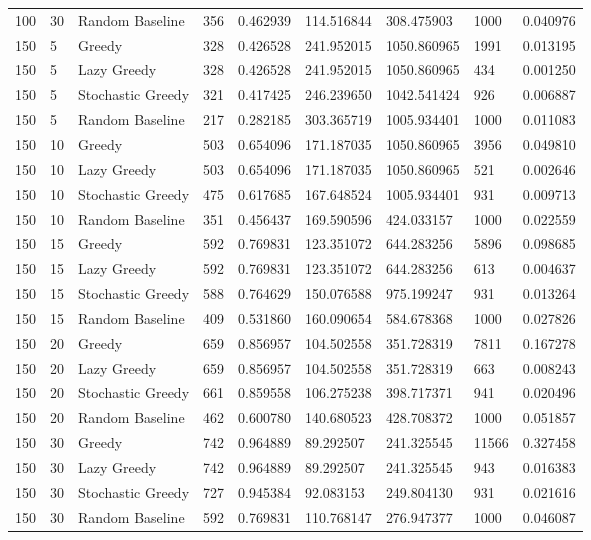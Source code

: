 \begin{tabular}{lllllllll}
100 & 30 & Random Baseline & 356 & 0.462939 & 114.516844 & 308.475903 & 1000 & 0.040976 \\
150 & 5 & Greedy & 328 & 0.426528 & 241.952015 & 1050.860965 & 1991 & 0.013195 \\
150 & 5 & Lazy Greedy & 328 & 0.426528 & 241.952015 & 1050.860965 & 434 & 0.001250 \\
150 & 5 & Stochastic Greedy & 321 & 0.417425 & 246.239650 & 1042.541424 & 926 & 0.006887 \\
150 & 5 & Random Baseline & 217 & 0.282185 & 303.365719 & 1005.934401 & 1000 & 0.011083 \\
150 & 10 & Greedy & 503 & 0.654096 & 171.187035 & 1050.860965 & 3956 & 0.049810 \\
150 & 10 & Lazy Greedy & 503 & 0.654096 & 171.187035 & 1050.860965 & 521 & 0.002646 \\
150 & 10 & Stochastic Greedy & 475 & 0.617685 & 167.648524 & 1005.934401 & 931 & 0.009713 \\
150 & 10 & Random Baseline & 351 & 0.456437 & 169.590596 & 424.033157 & 1000 & 0.022559 \\
150 & 15 & Greedy & 592 & 0.769831 & 123.351072 & 644.283256 & 5896 & 0.098685 \\
150 & 15 & Lazy Greedy & 592 & 0.769831 & 123.351072 & 644.283256 & 613 & 0.004637 \\
150 & 15 & Stochastic Greedy & 588 & 0.764629 & 150.076588 & 975.199247 & 931 & 0.013264 \\
150 & 15 & Random Baseline & 409 & 0.531860 & 160.090654 & 584.678368 & 1000 & 0.027826 \\
150 & 20 & Greedy & 659 & 0.856957 & 104.502558 & 351.728319 & 7811 & 0.167278 \\
150 & 20 & Lazy Greedy & 659 & 0.856957 & 104.502558 & 351.728319 & 663 & 0.008243 \\
150 & 20 & Stochastic Greedy & 661 & 0.859558 & 106.275238 & 398.717371 & 941 & 0.020496 \\
150 & 20 & Random Baseline & 462 & 0.600780 & 140.680523 & 428.708372 & 1000 & 0.051857 \\
150 & 30 & Greedy & 742 & 0.964889 & 89.292507 & 241.325545 & 11566 & 0.327458 \\
150 & 30 & Lazy Greedy & 742 & 0.964889 & 89.292507 & 241.325545 & 943 & 0.016383 \\
150 & 30 & Stochastic Greedy & 727 & 0.945384 & 92.083153 & 249.804130 & 931 & 0.021616 \\
150 & 30 & Random Baseline & 592 & 0.769831 & 110.768147 & 276.947377 & 1000 & 0.046087 \\

\end{tabular}
